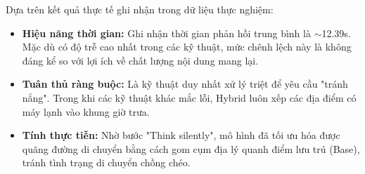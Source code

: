 Dựa trên kết quả thực tế ghi nhận trong dữ liệu thực nghiệm:
\begin{itemize}
    \item \textbf{Hiệu năng thời gian:} Ghi nhận thời gian phản hồi trung bình là $\sim$12.39s. Mặc dù có độ trễ cao nhất trong các kỹ thuật, mức chênh lệch này là không đáng kể so với lợi ích về chất lượng nội dung mang lại.
    \item \textbf{Tuân thủ ràng buộc:} Là kỹ thuật duy nhất xử lý triệt để yêu cầu "tránh nắng". Trong khi các kỹ thuật khác mắc lỗi, Hybrid luôn xếp các địa điểm có máy lạnh vào khung giờ trưa.
    \item \textbf{Tính thực tiễn:} Nhờ bước "Think silently", mô hình đã tối ưu hóa được quãng đường di chuyển bằng cách gom cụm địa lý quanh điểm lưu trú (Base), tránh tình trạng di chuyển chồng chéo.
\end{itemize}
